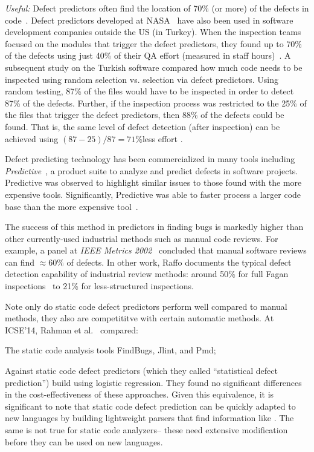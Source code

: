 {\em Useful:}
Defect predictors often  find the location of  70\% (or more)
of the defects in code~\cite{me07b}.
Defect predictors developed at NASA~\cite{me07b} have also been used in software development companies outside the US (in Turkey). When the inspection teams focused on the modules that trigger the defect predictors, they found up to 70\% of the defects using just 40\% of their QA effort (measured in staff hours)~\cite{tosun10}.
A subsequent study on the Turkish software
compared how much code needs to be inspected using
random selection vs. selection via defect
predictors. Using random testing, 87\% of the files
would have to be inspected in order to detect 87\%
of the defects. Further, if the inspection process
was restricted to the 25\% of the files that trigger
the defect predictors, then 88\% of the defects
could be found. That is, the same level of defect
detection (after inspection) can be achieved using
$(87-25)/87=71$\%less effort
\cite{tosun09}.


Defect predicting technology has been
commercialized in many tools including {\it Predictive}~\cite{turner06}, a
 product suite to analyze and predict
defects in software projects. Predictive was observed to
highlight similar issues to those found   with the more expensive tools. Significantly,
Predictive was able to faster process a larger code
base than the more expensive tool~\cite{turner06}.

The success of this method in  predictors in finding bugs is   markedly
higher than other currently-used
industrial
methods such as manual code reviews. For example, 
a  panel at {\em IEEE Metrics
2002}~\cite{shu02} concluded that manual software  reviews can find ${\approx}60\%$ 
of defects.
In other work, 
Raffo documents the typical    defect detection capability of
industrial review methods:   around 50\%
 for full Fagan inspections~\cite{fagan76} to
21\% for less-structured inspections.

Note only do static code defect predictors perform well compared to manual methods,
they also are competititve with certain automatic methods.
At ICSE'14, Rahman et al.~\cite{rahman14:icse} compared:
\bi
\item The static code analysis tools FindBugs, Jlint, and Pmd;
\item Against static code defect predictors
(which they called ``statistical defect prediction'') build using logistic regression.
\ei
They found  no significant differences in the cost-effectiveness
of these  approaches. Given this equivalence, it is significant to note that 
static code defect prediction can be quickly adapted to new languages by building lightweight
parsers that find   information like . The same is not true for   static code analyzers-- these need  extensive modification before they can be used on new
languages.

